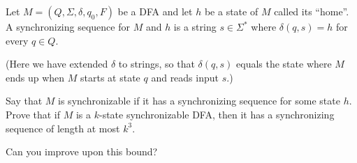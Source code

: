 \begin{enumerate}
            Let $M = (Q,\Sigma, \delta, q_0, F)$ be a DFA and let $h$ be a state of $M$ called its “home”. A synchronizing sequence for $M$ and $h$ is a string $s \in \Sigma^\ast$ where $\delta(q,s)=h$ for every $q \in Q$. 
            
            (Here we have extended $\delta$ to strings, so that $\delta(q,s)$ equals the state where $M$ ends up when $M$ starts at state $q$ and reads input $s$.) 
            
            Say that $M$ is synchronizable if it has a synchronizing sequence for some state $h$. Prove that if $M$ is a $k$-state synchronizable DFA, then it has a synchronizing sequence of length at most $k^3$. 
            
            Can you improve upon this bound?
            
\end{enumerate}
